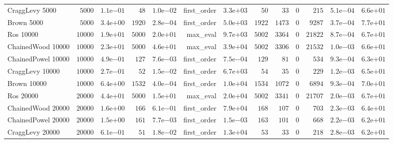 \begin{longtable}[c]{lrrrrrrrrrrrr}
CraggLevy 5000 & \( 5000\) & \( 1.1\)e\(-01\) & \(   48\) & \( 1.0\)e\(-02\) & first\_order & \( 3.3\)e\(+03\) & \(   50\) & \(   33\) & \(    0\) & \(  215\) & \( 5.1\)e\(-04\) & \( 6.6\)e\(+01\) \\
Brown 5000 & \( 5000\) & \( 3.4\)e\(+00\) & \( 1920\) & \( 2.8\)e\(-04\) & first\_order & \( 5.0\)e\(+03\) & \( 1922\) & \( 1473\) & \(    0\) & \( 9287\) & \( 3.7\)e\(-04\) & \( 7.7\)e\(+01\) \\
Ros 10000 & \(10000\) & \( 1.9\)e\(+01\) & \( 5000\) & \( 2.0\)e\(+01\) & max\_eval & \( 9.7\)e\(+03\) & \( 5002\) & \( 3364\) & \(    0\) & \(21822\) & \( 8.7\)e\(-04\) & \( 6.7\)e\(+01\) \\
ChainedWood 10000 & \(10000\) & \( 2.3\)e\(+01\) & \( 5000\) & \( 4.6\)e\(+01\) & max\_eval & \( 3.9\)e\(+04\) & \( 5002\) & \( 3306\) & \(    0\) & \(21532\) & \( 1.0\)e\(-03\) & \( 6.6\)e\(+01\) \\
ChainedPowel 10000 & \(10000\) & \( 4.9\)e\(-01\) & \(  127\) & \( 7.6\)e\(-03\) & first\_order & \( 7.5\)e\(-04\) & \(  129\) & \(   81\) & \(    0\) & \(  534\) & \( 9.3\)e\(-04\) & \( 6.3\)e\(+01\) \\
CraggLevy 10000 & \(10000\) & \( 2.7\)e\(-01\) & \(   52\) & \( 1.5\)e\(-02\) & first\_order & \( 6.7\)e\(+03\) & \(   54\) & \(   35\) & \(    0\) & \(  229\) & \( 1.2\)e\(-03\) & \( 6.5\)e\(+01\) \\
Brown 10000 & \(10000\) & \( 6.4\)e\(+00\) & \( 1532\) & \( 4.0\)e\(-04\) & first\_order & \( 1.0\)e\(+04\) & \( 1534\) & \( 1072\) & \(    0\) & \( 6894\) & \( 9.3\)e\(-04\) & \( 7.0\)e\(+01\) \\
Ros 20000 & \(20000\) & \( 4.4\)e\(+01\) & \( 5000\) & \( 1.5\)e\(+01\) & max\_eval & \( 2.0\)e\(+04\) & \( 5002\) & \( 3341\) & \(    0\) & \(21707\) & \( 2.0\)e\(-03\) & \( 6.7\)e\(+01\) \\
ChainedWood 20000 & \(20000\) & \( 1.6\)e\(+00\) & \(  166\) & \( 6.1\)e\(-01\) & first\_order & \( 7.9\)e\(+04\) & \(  168\) & \(  107\) & \(    0\) & \(  703\) & \( 2.3\)e\(-03\) & \( 6.4\)e\(+01\) \\
ChainedPowel 20000 & \(20000\) & \( 1.5\)e\(+00\) & \(  161\) & \( 7.7\)e\(-03\) & first\_order & \( 1.5\)e\(-03\) & \(  163\) & \(  101\) & \(    0\) & \(  668\) & \( 2.2\)e\(-03\) & \( 6.2\)e\(+01\) \\
CraggLevy 20000 & \(20000\) & \( 6.1\)e\(-01\) & \(   51\) & \( 1.8\)e\(-02\) & first\_order & \( 1.3\)e\(+04\) & \(   53\) & \(   33\) & \(    0\) & \(  218\) & \( 2.8\)e\(-03\) & \( 6.2\)e\(+01\) \\

\end{longtable}
